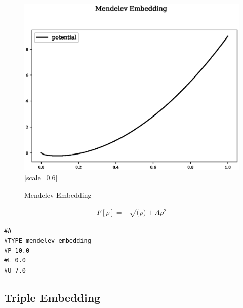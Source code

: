 \documentclass[12pt,twoside]{manual}
\begin{document}
\begin{appendices}
\begin{figure}[h]
  \begin{center}
    \includegraphics{img/plots/mendelev_embedding.eps}[scale=0.6]
    \caption{Mendelev Embedding}
    \label{graph:graph1}
  \end{center}
\end{figure}

\begin{equation}
\begin{split}
F[\rho] = - \sqrt(\rho) + A \rho^2
\end{split}
\label{eq:mendelevEmbedding}
\end{equation}

\begin{lstlisting}[style=pseudocode,caption={Mendelev Embedding}]
#A
#TYPE mendelev_embedding
#P 10.0
#L 0.0
#U 7.0
\end{lstlisting}


\subsection{Triple Embedding}


\end{appendices}
\end{document}
